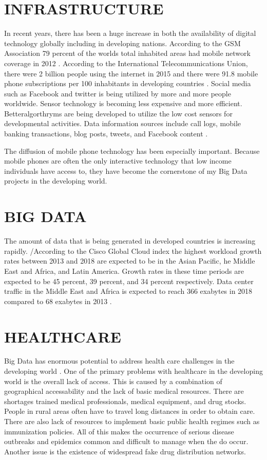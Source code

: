 \documentclass[sigconf]{acmart}
\begin{document}
\section{INFRASTRUCTURE}
In recent years, there has been a huge increase in both the availability of digital technology globally including in developing nations. According to the GSM Association 79 percent of the worlds total inhabited areas had mobile network coverage in 2012 \cite{DevEcon}. According to the International Telecommunications Union,  there were 2 billion people using the internet in 2015 and there were 91.8 mobile phone subscriptions per 100 inhabitants in developing countries \cite{DevEcon}.  Social media such as Facebook and twitter is being utilized by more and more people worldwide. Sensor technology is becoming less expensive and more efficient. Betteralgorthryms are being developed to utilize the low cost sensors for developmental activities. Data information sources include call logs, mobile banking transactions, blog posts, tweets, and Facebook content \cite{www-google-GloPls}.

The diffusion of mobile phone technology has been especially important. Because mobile phones are often the only interactive technology that low income individuals have access to, they have become the cornerstone of my Big Data projects in the developing world.

\section{BIG DATA}
The amount of data that is being generated in developed countries is increasing rapidly.  /According to the Cisco Global Cloud index the highest workload growth rates between 2013 and 2018 are expected to be in the Asian Pacific, he Middle East and Africa, and Latin America.  Growth rates in these time periods are expected to be 45 percent, 39 percent, and 34 percent respectively.  Data center traffic in the Middle East and Africa is expected to reach 366 exabytes in 2018 compared to 68 exabytes in 2013 \cite{DevEcon}. 

\section{HEALTHCARE}

Big Data has enormous potential to address health care challenges in the developing world \cite{DevEcon}. One of the primary problems with healthcare in the developing world is the overall lack of access. This is caused by a combination of geographical accessability and the lack of basic medical resources. There are shortages trained medical professionals, medical equipment,  and drug stocks. People in rural areas often have to travel long distances in order to obtain care. There are also lack of resources to implement basic public health regimes such as immunization policies.  All of this makes the occurrence of serious disease outbreaks and epidemics common and difficult to manage when the do occur. Another issue is the existence of widespread fake drug distribution networks.
\end{document}
